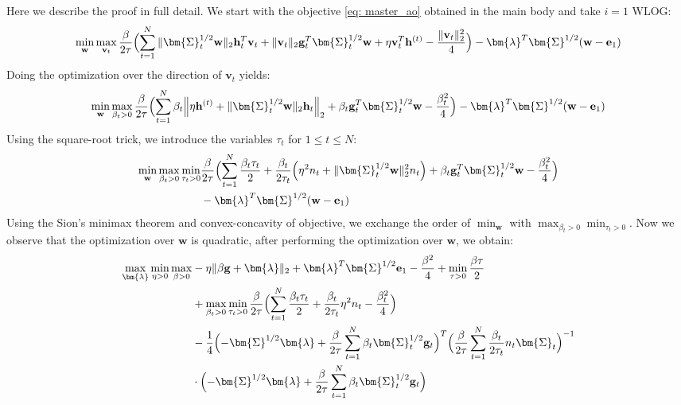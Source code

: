 \documentclass[final]{l4dc2026}
\newcommand{\bSigma}{\bm{\Sigma}}
\newcommand{\blambda}{\bm{\lambda}}
\newcommand{\be}{\mathbf{e}}
\newcommand{\bg}{\mathbf{g}}
\newcommand{\bh}{\mathbf{h}}
\newcommand{\bv}{\mathbf{v}}
\newcommand{\bw}{\mathbf{w}}
\begin{document}
Here we describe the proof in full detail. We start with the objective \eqref{eq: master_ao} obtained in the main body and take $i = 1$ WLOG:
\begin{align}
    \min_{\bw} \max_{\bv_t}  \frac{\beta}{2\tau} \Bigl( \sum_{t=1}^N \|\bSigma_t^{1/2}\bw\|_2 \bh_t^T \bv_t + \|\bv_t\|_2 \bg_t^T \bSigma_t^{1/2}\bw +   \eta \bv_t^T\bh^{(t)}   - \frac{\|\bv_t\|_2^2}{4}\Bigr)  - \blambda ^T \bSigma^{1/2} (\bw - \be_1)
\end{align}
Doing the optimization over the direction of $\bv_t$ yields:
\begin{align*}
    \min_{\bw} \max_{\beta_t> 0}  \frac{\beta}{2\tau} \Bigl( \sum_{t=1}^N \beta_t \Bigl\| \eta \bh^{(t)} +  \|\bSigma_t^{1/2}\bw\|_2 \bh_t \Bigr\|_2 + \beta_t \bg_t^T \bSigma_t^{1/2}\bw - \frac{\beta_t^2}{4} \Bigr)  - \blambda ^T \bSigma^{1/2} (\bw - \be_1)
\end{align*}
Using the square-root trick, we introduce the variables $\tau_t$ for $1\le t \le N$:
\begin{align*}
    \min_{\bw} \max_{\beta_t>0} \min_{\tau_t>0} &\frac{\beta}{2\tau} \Bigl( \sum_{t=1}^N \frac{\beta_t \tau_t}{2} + \frac{\beta_t}{2\tau_t} \Bigl( \eta^2 n_t +  \|\bSigma_t^{1/2}\bw\|^2_2 n_t \Bigr) + \beta_t \bg_t^T \bSigma_t^{1/2}\bw - \frac{\beta_t^2}{4}\Bigr) \\ 
    &- \blambda ^T \bSigma^{1/2} (\bw - \be_1)
\end{align*}
Using the Sion's minimax theorem and convex-concavity of objective, we exchange the order of $\min_{\bw}$ with $\max_{\beta_t>0} \min_{\tau_t>0}$. Now we observe that the optimization over $\bw$ is quadratic, after performing the optimization over $\bw$, we obtain:
\begin{align*}
    \max_{\blambda} \min_{\eta > 0} \max_{\beta>0}  &-\eta  \|\beta \bg + \blambda\|_2 + \blambda ^T \bSigma^{1/2} \be_1 - \frac{\beta^2}{4} + \min_{ \tau>0} \frac{\beta \tau}{2}\\
    &+\max_{\beta_t>0} \min_{\tau_t>0} \frac{\beta}{2\tau} \Bigl( \sum_{t=1}^N \frac{\beta_t \tau_t}{2} + \frac{\beta_t}{2\tau_t} \eta^2 n_t - \frac{\beta_t^2}{4} \Bigr)\\
    & -\frac{1}{4}\Bigl(-\bSigma^{1/2} \blambda + \frac{\beta}{2\tau}\sum_{t=1}^N \beta_t \bSigma_t^{1/2}\bg_t\Bigr)^T \Bigl(\frac{\beta}{2\tau}\sum_{t=1}^N \frac{\beta_t}{2\tau_t} n_t \bSigma_t \Bigr)^{-1} \\
    &\cdot \Bigl(-\bSigma^{1/2} \blambda + \frac{\beta}{2\tau}\sum_{t=1}^N \beta_t \bSigma_t^{1/2}\bg_t\Bigr)
\end{align*}
\end{document}
